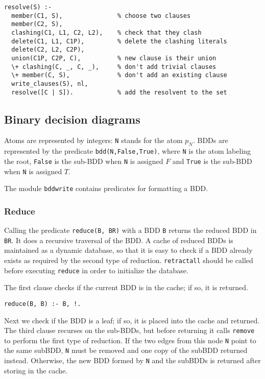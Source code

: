 \documentclass[11pt]{article}
\newcommand*{\p}[1]{\textup{\texttt{#1}}}
\begin{document}
\begin{verbatim}
resolve(S) :-
  member(C1, S),               % choose two clauses
  member(C2, S),               
  clashing(C1, L1, C2, L2),    % check that they clash
  delete(C1, L1, C1P),         % delete the clashing literals
  delete(C2, L2, C2P),         
  union(C1P, C2P, C),          % new clause is their union
  \+ clashing(C, _, C, _),     % don't add trivial clauses
  \+ member(C, S),             % don't add an existing clause
  write_clauses(S), nl,        
  resolve([C | S]).            % add the resolvent to the set
\end{verbatim}


\subsection{Binary decision diagrams}\label{s.bdd}

Atoms are represented by integers: \p{N} stands for the atom $p_{N}$.
BDDs are represented by the predicate \p{bdd(N,False,True)}, where \p{N}
is the atom labeling the root, \p{False} is the sub-BDD when \p{N} is
assigned $F$ and \p{True} is the sub-BDD when \p{N} is assigned $T$.

The module \p{bddwrite} contains predicates for formatting a BDD.

\subsubsection{Reduce}

Calling the predicate \p{reduce(B, BR)} with a BDD \p{B} returns the
reduced BDD in \p{BR}. It does a recursive traversal of the BDD. A cache
of reduced BDDs is maintained as a dynamic database, so that it is easy
to check if a BDD already exists as required by the second type of
reduction. \p{retractall} should be called before executing \p{reduce}
in order to initialize the database.

The first clause checks if the current BDD is in the cache; if so,
it is returned.

\begin{verbatim}
reduce(B, B) :- B, !.
\end{verbatim}

Next we check if the BDD is a leaf; if so, it is placed into the cache
and returned. The third clause recurses on the sub-BDDs, but before
returning it calls \p{remove} to perform the first type of reduction. If
the two edges from this node \p{N} point to the same subBDD, \p{N} must
be removed and one copy of the subBDD returned instead. Otherwise, the
new BDD formed by \p{N} and the subBDDs is returned after storing in the
cache.
\end{document}
